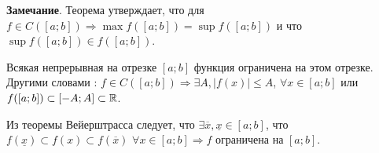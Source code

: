 \textbf{Замечание}.
Теорема утверждает, что для $f \in C([a;b]) \Rightarrow \max f([a;b]) = \sup f([a;b])$ и что $\sup f([a;b]) \in f([a;b])$.\\
\begin{corollary}
	Всякая непрерывная на отрезке $[a;b]$ функция ограничена на этом отрезке.\\
	Другими словами : $f \in C([a;b]) \Rightarrow \exists A, |f(x)| \leqslant A$, $\forall x \in [a;b]$
	или $f([a;b]) \subset [-A;A] \subset \mathbb{R}$.
\end{corollary}
\begin{Proof}
	Из теоремы Вейерштрасса следует, что $\exists \overline{x}, \underline{x} \in [a;b]$, что $f(\underline{x}) \subset f(x) \subset f(\overline{x})$ $\forall x \in [a;b] \Rightarrow f $ ограничена на $[a;b]$. 
\end{Proof}
